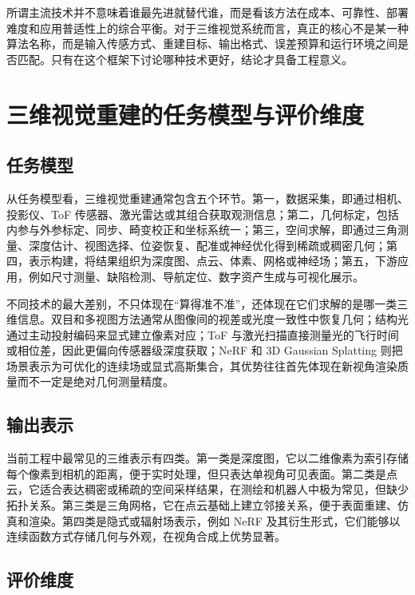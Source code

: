 \documentclass[12pt,a4paper]{ctexart}
\begin{document}
所谓主流技术并不意味着谁最先进就替代谁，而是看该方法在成本、可靠性、部署难度和应用普适性上的综合平衡。对于三维视觉系统而言，真正的核心不是某一种算法名称，而是输入传感方式、重建目标、输出格式、误差预算和运行环境之间是否匹配。只有在这个框架下讨论哪种技术更好，结论才具备工程意义。

\section{三维视觉重建的任务模型与评价维度}

\subsection{任务模型}

从任务模型看，三维视觉重建通常包含五个环节。第一，数据采集，即通过相机、投影仪、ToF 传感器、激光雷达或其组合获取观测信息；第二，几何标定，包括内参与外参标定、同步、畸变校正和坐标系统一；第三，空间求解，即通过三角测量、深度估计、视图选择、位姿恢复、配准或神经优化得到稀疏或稠密几何；第四，表示构建，将结果组织为深度图、点云、体素、网格或神经场；第五，下游应用，例如尺寸测量、缺陷检测、导航定位、数字资产生成与可视化展示。\cite{schonberger2016sfm,schonberger2016mvs,cheng2018laser,mildenhall2020nerf}

不同技术的最大差别，不只体现在“算得准不准”，还体现在它们求解的是哪一类三维信息。双目和多视图方法通常从图像间的视差或光度一致性中恢复几何；结构光通过主动投射编码来显式建立像素对应；ToF 与激光扫描直接测量光的飞行时间或相位差，因此更偏向传感器级深度获取；NeRF 和 3D Gaussian Splatting 则把场景表示为可优化的连续场或显式高斯集合，其优势往往首先体现在新视角渲染质量而不一定是绝对几何测量精度。\cite{salvi2010,foix2011tof,he2017toferror,piatti2012tof,mildenhall2020nerf,kerbl2023gaussian}

\subsection{输出表示}

当前工程中最常见的三维表示有四类。第一类是深度图，它以二维像素为索引存储每个像素到相机的距离，便于实时处理，但只表达单视角可见表面。第二类是点云，它适合表达稠密或稀疏的空间采样结果，在测绘和机器人中极为常见，但缺少拓扑关系。第三类是三角网格，它在点云基础上建立邻接关系，便于表面重建、仿真和渲染。第四类是隐式或辐射场表示，例如 NeRF 及其衍生形式，它们能够以连续函数方式存储几何与外观，在视角合成上优势显著。\cite{seitz2006,schoeps2017eth3d,mildenhall2020nerf,kerbl2023gaussian}

\subsection{评价维度}
\end{document}
